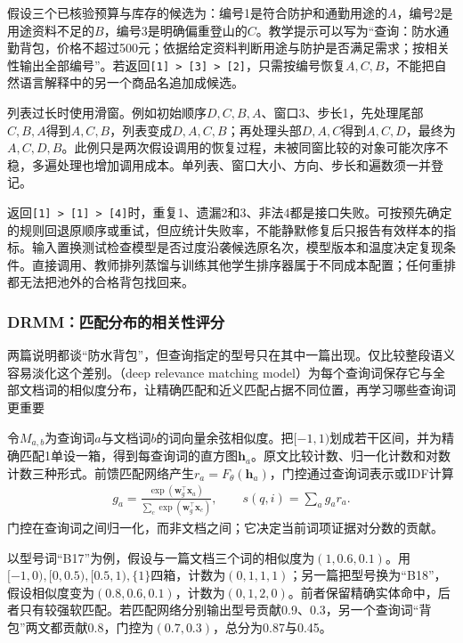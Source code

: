 假设三个已核验预算与库存的候选为：编号1是符合防护和通勤用途的$A$，编号2是用途资料不足的$B$，编号3是明确偏重登山的$C$。教学提示可以写为“查询：防水通勤背包，价格不超过500元；依据给定资料判断用途与防护是否满足需求；按相关性输出全部编号”。若返回\texttt{[1] > [3] > [2]}，只需按编号恢复$A,C,B$，不能把自然语言解释中的另一个商品名追加成候选。

列表过长时使用滑窗。例如初始顺序$D,C,B,A$、窗口3、步长1，先处理尾部$C,B,A$得到$A,C,B$，列表变成$D,A,C,B$；再处理头部$D,A,C$得到$A,C,D$，最终为$A,C,D,B$。此例只是两次假设调用的恢复过程，未被同窗比较的对象可能次序不稳，多遍处理也增加调用成本。单列表、窗口大小、方向、步长和遍数须一并登记。

返回\texttt{[1] > [1] > [4]}时，重复1、遗漏2和3、非法4都是接口失败。可按预先确定的规则回退原顺序或重试，但应统计失败率，不能静默修复后只报告有效样本的指标。输入置换测试检查模型是否过度沿袭候选原名次，模型版本和温度决定复现条件。直接调用、教师排列蒸馏与训练其他学生排序器属于不同成本配置；任何重排都无法把池外的合格背包找回来。

\Needspace{100mm}
\subsubsection{DRMM：匹配分布的相关性评分}
\label{sec:rs-search-drmm}

两篇说明都谈“防水背包”，但查询指定的型号只在其中一篇出现。仅比较整段语义容易淡化这个差别。（deep relevance matching model）为每个查询词保存它与全部文档词的相似度分布，让精确匹配和近义匹配占据不同位置，再学习哪些查询词更重要

令$M_{a,b}$为查询词$a$与文档词$b$的词向量余弦相似度。把$[-1,1)$划成若干区间，并为精确匹配1单设一箱，得到每查询词的直方图$\bm h_a$。原文比较计数、归一化计数和对数计数三种形式。前馈匹配网络产生$r_a=F_\theta(\bm h_a)$，门控通过查询词表示或IDF计算
\begin{equation}
 \begin{split}
 g_a=\frac{\exp(\bm w_g^\top\bm x_a)}
 {\sum_c\exp(\bm w_g^\top\bm x_c)},\qquad
 s(q,i)=\sum_a g_a r_a .
 \end{split}
 \label{eq:rs-search-drmm}
\end{equation}
门控在查询词之间归一化，而非文档之间；它决定当前词项证据对分数的贡献。

以型号词“B17”为例，假设与一篇文档三个词的相似度为$(1,0.6,0.1)$。用$[-1,0),[0,0.5),[0.5,1),\{1\}$四箱，计数为$(0,1,1,1)$；另一篇把型号换为“B18”，假设相似度变为$(0.8,0.6,0.1)$，计数为$(0,1,2,0)$。前者保留精确实体命中，后者只有较强软匹配。若匹配网络分别输出型号贡献0.9、0.3，另一个查询词“背包”两文都贡献0.8，门控为$(0.7,0.3)$，总分为0.87与0.45。

